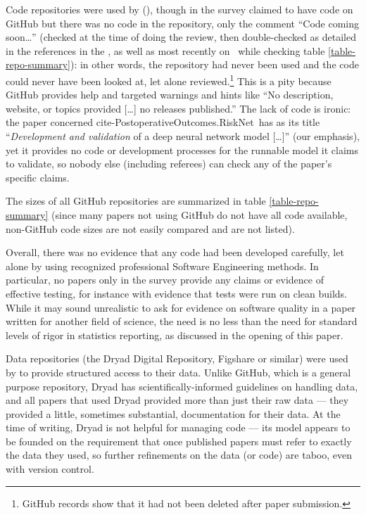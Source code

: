 \documentclass[10pt,a4paper]{article}
\begin{document}
Code repositories were used by  (\pc{\countUsesVersionControlRepository}{\dataN}), though  in the survey claimed to have code on GitHub but there was no code in the repository, only the comment ``Code coming soon\ldots'' (checked at the time of doing the review, then double-checked as detailed in the references in the \supplement, as well as most recently on \clonedate\
while checking table \ref{table-repo-summary}): in other words, the repository had never been used and the code could never have been looked at, let alone reviewed.\footnote{GitHub records show that it had not been deleted after paper submission.} This is a pity because GitHub provides help and targeted warnings and hints like ``No description, website, or topics provided [\ldots] no releases published.'' The lack of code is ironic: the paper concerned \csname cite-PostoperativeOutcomes.RiskNet\endcsname\ has as its title ``\emph{Development and validation\/} of a deep neural network model [\ldots]'' (our emphasis), yet it provides no code or development processes for the runnable model it claims to validate, so nobody else (including referees) can check any of the paper's specific claims.

The sizes of all GitHub repositories are summarized in table \ref{table-repo-summary} (since many papers not using GitHub do not have all code available, non-GitHub code sizes are not easily compared and are not listed). 

Overall, there was no evidence that any code had been developed carefully, let alone by using recognized professional Software Engineering methods. In particular, 
\ifnum \countCodetested=0
no papers
\else only 
\fi in the survey provide any claims or evidence of effective testing, for instance with evidence that tests were run on clean builds. {While it may sound unrealistic to ask for evidence on software quality in a paper written for another field of science, the need is no less than the need for standard levels of rigor in statistics reporting, as discussed in the opening of this paper.}

Data repositories (the Dryad Digital Repository, Figshare or similar) were used by  to provide structured access to their data. Unlike GitHub, which is a general purpose repository, Dryad has scientifically-informed guidelines on handling data, and all papers that used Dryad provided more than just their raw data --- they provided a little, sometimes substantial, documentation for their data. At the time of writing, Dryad is not helpful for managing code --- its model appears to be founded on the requirement that once published papers must refer to exactly the data they used, so further refinements on the data (or code) are taboo, even with version control.
\end{document}
